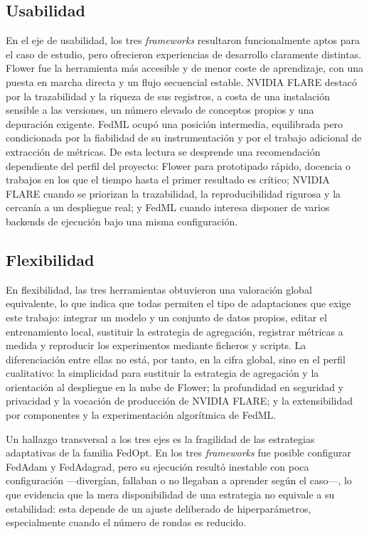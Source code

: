 \subsection{Usabilidad}
\label{sec:concl-usabilidad}

En el eje de usabilidad, los tres \textit{frameworks} resultaron funcionalmente aptos para el
caso de estudio, pero ofrecieron experiencias de desarrollo claramente distintas.
Flower fue la herramienta más accesible y de menor coste de aprendizaje, con una
puesta en marcha directa y un flujo secuencial estable. NVIDIA FLARE destacó por la
trazabilidad y la riqueza de sus registros, a costa de una instalación sensible a las
versiones, un número elevado de conceptos propios y una depuración exigente. FedML
ocupó una posición intermedia, equilibrada pero condicionada por la fiabilidad de su
instrumentación y por el trabajo adicional de extracción de métricas. De esta lectura
se desprende una recomendación dependiente del perfil del proyecto: Flower para
prototipado rápido, docencia o trabajos en los que el tiempo hasta el primer resultado
es crítico; NVIDIA FLARE cuando se priorizan la trazabilidad, la reproducibilidad
rigurosa y la cercanía a un despliegue real; y FedML cuando interesa disponer de varios
backends de ejecución bajo una misma configuración.

\subsection{Flexibilidad}
\label{sec:concl-flexibilidad}

En flexibilidad, las tres herramientas obtuvieron una valoración global equivalente, lo
que indica que todas permiten el tipo de adaptaciones que exige este trabajo: integrar
un modelo y un conjunto de datos propios, editar el entrenamiento local, sustituir la
estrategia de agregación, registrar métricas a medida y reproducir los experimentos
mediante ficheros y scripts. La diferenciación entre ellas no está, por tanto, en la
cifra global, sino en el perfil cualitativo: la simplicidad para sustituir la estrategia
de agregación y la orientación al despliegue en la nube de Flower; la profundidad en
seguridad y privacidad y la vocación de producción de NVIDIA FLARE; y la extensibilidad
por componentes y la experimentación algorítmica de FedML.

Un hallazgo transversal a los tres ejes es la fragilidad de las
estrategias adaptativas de la familia FedOpt. En los tres \textit{frameworks} fue posible
configurar FedAdam y FedAdagrad, pero su ejecución resultó inestable con poca
configuración —divergían, fallaban o no llegaban a aprender según el caso—, lo que
evidencia que la mera disponibilidad de una estrategia no equivale a su estabilidad:
esta depende de un ajuste deliberado de hiperparámetros, especialmente cuando el número
de rondas es reducido.

